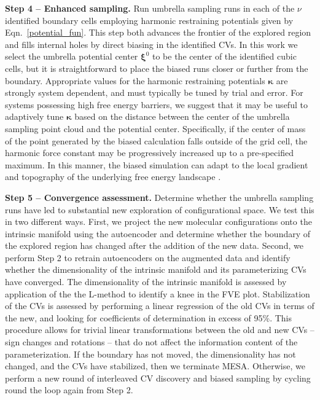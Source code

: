 \documentclass[12pt]{article}
\newcommand*{\blauw}[1]{#1}
\begin{document}
\textbf{Step 4 -- Enhanced sampling.} Run umbrella sampling runs in each of the $\nu$ identified boundary cells employing harmonic restraining potentials given by \blauw{Eqn.~\ref{potential_fun}}. This step both advances the frontier of the explored region and fills internal holes by direct biasing in the identified CVs. In this work we select the umbrella potential center $\boldsymbol\xi^0$ to be the center of the identified cubic cells, but it is straightforward to place the biased runs closer or further from the boundary. Appropriate values for the harmonic restraining potentials $\boldsymbol\kappa$ are strongly system dependent, and must typically be tuned by trial and error. For systems possessing high free energy barriers, we suggest that it may be useful to adaptively tune $\boldsymbol\kappa$ based on the distance between the center of the umbrella sampling point cloud and the potential center. Specifically, if the center of mass of the point generated by the biased calculation falls outside of the grid cell, the harmonic force constant may be progressively increased up to a pre-specified maximum. In this manner, the biased simulation can adapt to the local gradient and topography of the underlying free energy landscape \cite{chiavazzo2017intrinsic}.

\textbf{Step 5 -- Convergence assessment.} Determine whether the umbrella sampling runs have led to substantial new exploration of configurational space. We test this in two different ways. First, we project the new molecular configurations onto the intrinsic manifold using the autoencoder and determine whether the boundary of the explored region has changed after the addition of the new data. Second, we perform \blauw{Step 2} to retrain autoencoders on the augmented data and identify whether the dimensionality of the intrinsic manifold and its parameterizing CVs have converged. The dimensionality of the intrinsic manifold is assessed by application of the the L-method\cite{salvador2004determining} to identify a knee in the FVE plot. Stabilization of the CVs is assessed by performing a linear regression of the old CVs in terms of the new, and looking for coefficients of determination in excess of 95\%. This procedure allows for trivial linear transformations between the old and new CVs -- sign changes and rotations -- that do not affect the information content of the parameterization. If the boundary has not moved, the dimensionality has not changed, and the CVs have stabilized, then we terminate MESA. Otherwise, we perform a new round of interleaved CV discovery and biased sampling by cycling round the loop again from \blauw{Step 2}.
\end{document}
